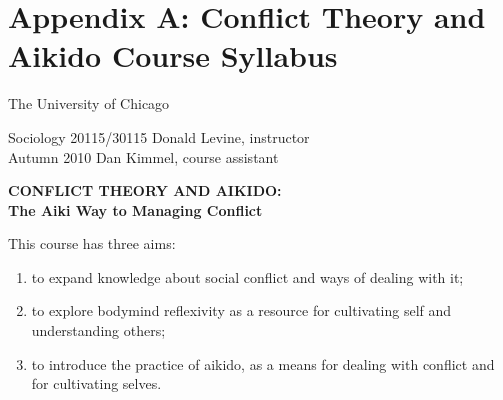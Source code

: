 \chapter*{Appendix A: Conflict Theory and Aikido Course Syllabus}

\newcommand{\syllabustitle}[1]{\noindent{\textbf{\large{\uppercase{#1}}}}}
\newcommand{\week}[2]{\textbf{#1 --- \emph{#2}}}

\footnotesize

\begin{center}The University of Chicago\end{center}
Sociology 20115/30115 \hfill{} Donald Levine, instructor\\
Autumn 2010 \hfill{} Dan Kimmel, course assistant

\begin{center}
\large\textbf{\uppercase{Conflict Theory and Aikido}:\\
The Aiki Way to Managing Conflict}
\end{center}

\noindent This course has three aims:

\begin{enumerate}[noitemsep]
\item to expand knowledge about social conflict and ways of dealing with it;
\item to explore bodymind reflexivity as a resource for cultivating self and understanding others;
\item to introduce the practice of aikido, as a means for dealing with conflict and for cultivating selves.
\end{enumerate}

